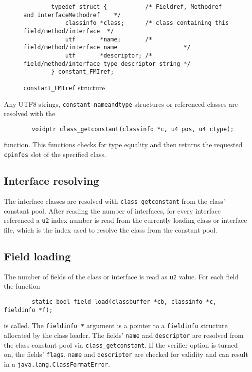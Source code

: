 \begin{itemize}
 \endgroup

\begin{figure}[h]
\begin{verbatim}
        typedef struct {           /* Fieldref, Methodref and InterfaceMethodref    */
            classinfo *class;      /* class containing this field/method/interface  */
            utf       *name;       /* field/method/interface name                   */
            utf       *descriptor; /* field/method/interface type descriptor string */
        } constant_FMIref;
\end{verbatim}
\caption{\texttt{constant\_FMIref} structure}
\label{constantFMIref}
\end{figure}

\end{itemize}

Any UTF8 strings, \texttt{constant\_nameandtype} structures or
referenced classes are resolved with the

\begin{verbatim}
        voidptr class_getconstant(classinfo *c, u4 pos, u4 ctype);
\end{verbatim}

function. This functions checks for type equality and then returns the
requested \texttt{cpinfos} slot of the specified class.


\subsection{Interface resolving}

The interface classes are resolved with \texttt{class\_getconstant}
from the class' constant pool. After reading the number of interfaces,
for every interface referenced a \texttt{u2} index number is read from
the currently loading class or interface file, which is the index used
to resolve the class from the constant pool.


\subsection{Field loading}

The number of fields of the class or interface is read as \texttt{u2}
value. For each field the function

\begin{verbatim}
        static bool field_load(classbuffer *cb, classinfo *c, fieldinfo *f);
\end{verbatim}

is called. The \texttt{fieldinfo *} argument is a pointer to a
\texttt{fieldinfo} structure allocated by the class loader. The
fields' \texttt{name} and \texttt{descriptor} are resolved from the
class constant pool via \texttt{class\_getconstant}. If the verifier
option is turned on, the fields' \texttt{flags}, \texttt{name} and
\texttt{descriptor} are checked for validity and can result in a
\texttt{java.lang.ClassFormatError}.

